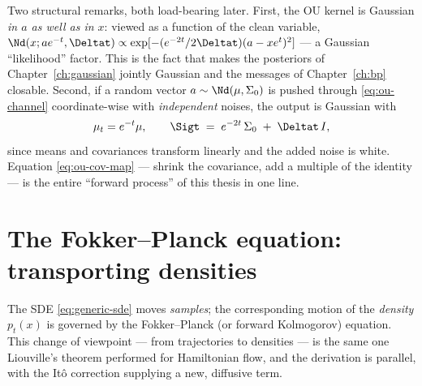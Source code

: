 Two structural remarks, both load-bearing later. First, the OU kernel is
Gaussian \emph{in $a$ as well as in $x$}: viewed as a function of the clean
variable, $\Nd(x; a e^{-t}, \Deltat) \propto
\exp[-(e^{-2t}/2\Deltat)(a - x e^{t})^2]$ --- a Gaussian ``likelihood''
factor. This is the fact that makes the posteriors of
Chapter~\ref{ch:gaussian} jointly Gaussian and the messages of
Chapter~\ref{ch:bp} closable. Second, if a random vector
$a \sim \Nd(\mu, \Sigma_0)$ is pushed through \eqref{eq:ou-channel}
coordinate-wise with \emph{independent} noises, the output is Gaussian with
\begin{equation}
  \mu_t = e^{-t}\mu,
  \qquad
  \Sigt \;=\; e^{-2t}\, \Sigma_0 \;+\; \Deltat\, I ,
  \label{eq:ou-cov-map}
\end{equation}
since means and covariances transform linearly and the added noise is white.
Equation \eqref{eq:ou-cov-map} --- shrink the covariance, add a multiple of
the identity --- is the entire ``forward process'' of this thesis in one
line.

\section{The Fokker--Planck equation: transporting densities}
\label{sec:fokker-planck}

The SDE \eqref{eq:generic-sde} moves \emph{samples}; the corresponding
motion of the \emph{density} $p_t(x)$ is governed by the Fokker--Planck (or
forward Kolmogorov) equation. This change of viewpoint --- from trajectories
to densities --- is the same one Liouville's theorem performed for
Hamiltonian flow, and the derivation is parallel, with the It\^o correction
supplying a new, diffusive term.


